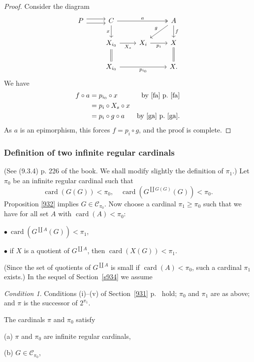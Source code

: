 \documentclass[12pt]{article}%
\theoremstyle{remark}
\newtheorem{cond}[thm]{Condition}
\theoremstyle{definition}
\newcommand{\bu}{\bullet}
\newcommand{\nn}{\noindent}
\newcommand{\C}{\mathcal C}
\DeclareMathOperator{\card}{card}%
\begin{document}
\begin{proof}
Consider the diagram 
$$
\begin{tikzcd}
P\ar[yshift=0.7ex]{r}\ar[yshift=-0.7ex]{r}&C\ar{d}[swap]{x}\ar[two heads]{rr}{a}&&A\ar{dl}[swap]{g}\ar{d}{f}\\ 
{}&X_{i_0}\ar{r}[swap]{X_s}\ar[equal]{d}&X_i\ar{r}[swap]{p_i}&X\ar[equal]{d}\\ 
{}&X_{i_0}\ar{rr}[swap]{p_{i_0}}&&X.
\end{tikzcd}
$$ 
We have 
%
\begin{align*}
f\circ a&=p_{i_0}\circ x&\text{by \eqref{fa} p.~\pageref{fa}}\\ 
&=p_i\circ X_s\circ x\\ 
&=p_i\circ g\circ a&\text{by \eqref{ga} p.~\pageref{ga}}.
\end{align*}
%
As $a$ is an epimorphism, this forces $f=p_i\circ g$, and the proof is complete.
\end{proof}


\subsubsection{Definition of two infinite regular cardinals}\label{tirg}

(See (9.3.4) p. 226 of the book. We shall modify slightly the definition of $\pi_1$.) Let $\pi_0$ be an infinite regular cardinal such that 
$$
\card(G(G))<\pi_0,\quad\card(G^{\coprod G(G)}(G))<\pi_0.
$$ 
Proposition \ref{932} implies $G\in\C_{\pi_0}$. Now choose a cardinal $\pi_1\ge\pi_0$ such that we have for all set $A$ with $\card(A)<\pi_0$: 

$\bu\ \card(G^{\coprod A}(G))<\pi_1$, 

$\bu$ if $X$ is a quotient of $G^{\coprod A}$, then $\card(X(G))<\pi_1$. 

\nn(Since the set of quotients of $G^{\coprod A}$ is small if $\card(A)<\pi_0$, such a cardinal $\pi_1$ exists.) In the sequel of Section~\ref{s934} we assume 

\begin{cond}\label{ass}
Conditions (i)--(v) of Section~\ref{931} p.~\pageref{931} hold; $\pi_0$ and $\pi_1$ are as above; and $\pi$ is the successor of $2^{\pi_1}$.
\end{cond}

\nn The cardinals $\pi$ and $\pi_0$ satisfy 

(a) $\pi$ and $\pi_0$ are infinite regular cardinals,

(b) $G\in\C_{\pi_0}$,
\end{document}
